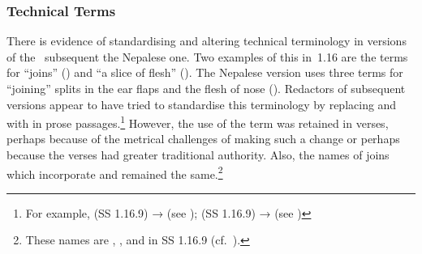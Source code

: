 


\subsubsection{Technical Terms}

There is evidence of standardising and altering technical terminology in versions
of the \SS\ subsequent the Nepalese one. Two examples of this in \SS\,1.16 are the
terms for “joins” () and “a slice of flesh”
(). The Nepalese version uses three
terms for “joining” splits in the ear flaps and the flesh of nose (). Redactors of 
    subsequent
versions appear to have tried to standardise this terminology by replacing
 and  with  in prose passages.\footnote{For
    example,  (SS 1.16.9) → 
    (see );  (SS 1.16.9) →
     (see )} However, the use of the term
     was retained in verses, perhaps because of the metrical challenges
    of making such a change or perhaps because the verses 
    had greater traditional authority. Also, the names of joins which incorporate 
    and  remained the same.\footnote{These names are 
    ,
        , and  in SS 1.16.9 (cf.\
        ).}

